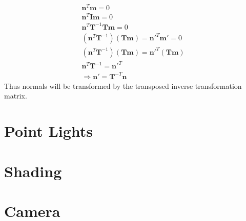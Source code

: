 \begin{align}
\mathbf{n}^T\mathbf{m} = 0 \\
\mathbf{n}^T\mathbf{I}\mathbf{m} = 0 \\
\mathbf{n}^T\mathbf{T}^{-1}\mathbf{T}\mathbf{m} = 0 \\
(\mathbf{n}^T\mathbf{T}^{-1})(\mathbf{T}\mathbf{m}) = \mathbf{n'}^T\mathbf{m'} =  0 \\
(\mathbf{n}^T\mathbf{T}^{-1})(\mathbf{T}\mathbf{m}) = \mathbf{n'}^T(\mathbf{Tm}) \\
\mathbf{n}^T\mathbf{T}^{-1} = \mathbf{n'}^T \\
\Rightarrow \mathbf{n'} = \mathbf{T}^{-T}\mathbf{n}
\end{align}
Thus normals will be transformed by the transposed inverse transformation matrix.

\section{Point Lights}



\section{Shading}



\section{Camera}



